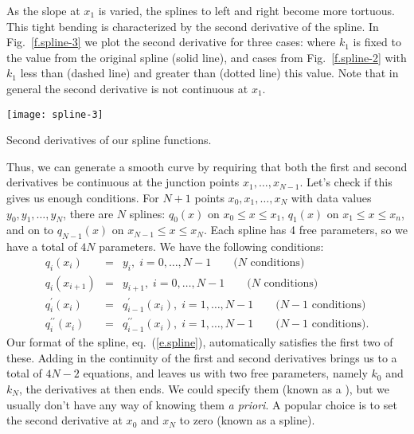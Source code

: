 As the slope at $x_{1}$ is varied, the splines to left and right become more tortuous. This tight bending is characterized by the second derivative of the spline. In Fig.~\ref{f.spline-3} we plot the second derivative for three cases: where $k_{1}$ is fixed to the value from the original spline (solid line), and cases from Fig.~\ref{f.spline-2} with $k_{1}$ less than (dashed line) and greater than (dotted line) this value. Note that in general the second derivative is not continuous at $x_{1}$. 

\begin{marginfigure}
\texttt{[image: spline-3]}
\caption{\label{f.spline-3} Second derivatives of our spline functions.}
\end{marginfigure}

Thus, we can generate a smooth curve by requiring that both the first and second derivatives be continuous at the junction points $x_{1},\ldots,x_{N-1}$. Let's check if this gives us enough conditions. For $N+1$ points $x_{0},x_{1},\ldots,x_{N}$ with data values $y_{0},y_{1},\ldots,y_{N}$, there are $N$ splines: $q_{0}(x)$ on $x_{0}\le x\le x_{1}$, $q_{1}(x)$ on $x_{1}\le x \le x_{n}$, and on to $q_{N-1}(x)$ on $x_{N-1}\le x\le x_{N}$. Each spline has 4 free parameters, so we have a total of $4N$ parameters. We have the following conditions:
\begin{eqnarray*}
q_{i}(x_{i}) &=& y_{i},\;i=0,\ldots,N-1\qquad\textrm{($N$ conditions)}\\
q_{i}(x_{i+1}) &=& y_{i+1},\;i=0,\ldots,N-1\qquad\textrm{($N$ conditions)}\\
q^{\prime}_{i}(x_{i}) &=& q^{\prime}_{i-1}(x_{i}),\;i=1,\ldots,N-1\qquad\textrm{($N-1$ conditions)}\\
q^{\prime\prime}_{i}(x_{i}) &=& q^{\prime\prime}_{i-1}(x_{i}),\;i=1,\ldots,N-1\qquad\textrm{($N-1$ conditions)}.
\end{eqnarray*}
Our format of the spline, eq.~(\ref{e.spline}), automatically satisfies the first two of these. Adding in the continuity of the first and second derivatives brings us to a total of $4N-2$ equations, and leaves us with two free parameters, namely $k_{0}$ and $k_{N}$, the derivatives at then ends. We could specify them (known as a ), but we usually don't have any way of knowing them \emph{a priori}. A popular choice is to set the second derivative at $x_{0}$ and $x_{N}$ to zero (known as a  spline).

